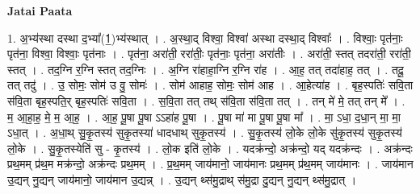 \documentclass[17pt]{extarticle}
\begin{document}
\textbf{Jatai Paata} \newline

1. अ॒भ्य॑स्था दस्था द॒भ्या᳚(1॒)भ्य॑स्थात् । . अ॒स्था॒द् विश्वा॒ विश्वा॑ अस्था दस्था॒द् विश्वाः᳚ । . विश्वाः॒ पृत॑नाः॒ पृत॑ना॒ विश्वा॒ विश्वाः॒ पृत॑नाः । . पृत॑ना॒ अरा॑ती॒ ररा॑तीः॒ पृत॑नाः॒ पृत॑ना॒ अरा॑तीः । . अरा॑ती॒ स्तत् तदरा॑ती॒ ररा॑ती॒ स्तत् । . तद॒ग्नि र॒ग्नि स्तत् तद॒ग्निः । . अ॒ग्नि रा॑हाहा॒ग्नि र॒ग्नि रा॑ह । . आ॒ह॒ तत् तदा॑हाह॒ तत् । . तदू॒ तत् तदु॑ । . उ॒ सोमः॒ सोम॑ उ वु॒ सोमः॑ । . सोम॑ आहाह॒ सोमः॒ सोम॑ आह । . आ॒हेत्या॑ह । . बृह॒स्पतिः॑ सवि॒ता स॑वि॒ता बृह॒स्पति॒र् बृह॒स्पतिः॑ सवि॒ता । . स॒वि॒ता तत् तथ् स॑वि॒ता स॑वि॒ता तत् । . तन् मे॑ मे॒ तत् तन् मे᳚ । . म॒ आ॒हा॒ह॒ मे॒ म॒ आ॒ह॒ । . आ॒ह॒ पू॒षा पू॒षा ऽऽहा॑ह पू॒षा । . पू॒षा मा॑ मा पू॒षा पू॒षा मा᳚ । . मा॒ ऽधा॒ द॒धा॒न् मा॒ मा॒ ऽधा॒त् । . अ॒धा॒थ् सु॒कृ॒तस्य॑ सुकृ॒तस्या॑ धादधाथ् सुकृ॒तस्य॑ । . सु॒कृ॒तस्य॑ लो॒के लो॒के सु॑कृ॒तस्य॑ सुकृ॒तस्य॑ लो॒के । . सु॒कृ॒तस्येति॑ सु - कृ॒तस्य॑ । . लो॒क इति॑ लो॒के । . यदक्र॑न्दो॒ अक्र॑न्दो॒ यद् यदक्र॑न्दः । . अक्र॑न्दः प्रथ॒मम् प्र॑थ॒म मक्र॑न्दो॒ अक्र॑न्दः प्रथ॒मम् । . प्र॒थ॒मम् जाय॑मानो॒ जाय॑मानः प्रथ॒मम् प्र॑थ॒मम् जाय॑मानः । . जाय॑मान उ॒द्यन् नु॒द्यन् जाय॑मानो॒ जाय॑मान उ॒द्यन्न् । . उ॒द्यन् थ्स॑मु॒द्राथ् स॑मु॒द्रा दु॒द्यन् नु॒द्यन् थ्स॑मु॒द्रात् । \newline
\end{document}
